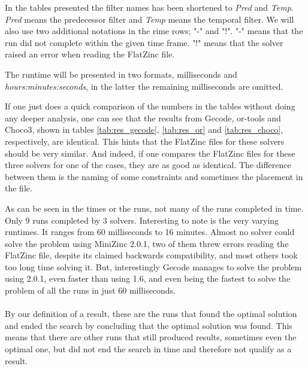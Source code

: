 In the tables presented the filter names has been shortened to \emph{Pred} and \emph{Temp}. \emph{Pred} means the predecessor filter and \emph{Temp} means the temporal filter. We will also use two additional notations in the rime rows; "-" and "!". "-" means that the run did not complete within the given time frame. "!" means that the solver raised an error when reading the FlatZinc file.

The runtime will be presented in two formats, milliseconds and \emph{hours:minutes:seconds}, in the latter the remaining milliseconds are omitted.














If one just does a quick comparison of the numbers in the tables without doing any deeper analysis, one can see that the results from Gecode, or-tools and Choco3, shown in tables \ref{tab:res_gecode}, \ref{tab:res_or} and \ref{tab:res_choco}, respectively, are identical. This hints that the FlatZinc files for these solvers should be very similar. And indeed, if one compares the FlatZinc files for these three solvers for one of the cases, they are as good as identical. The difference between them is the naming of some constraints and sometimes the placement in the file.

As can be seen in the times or the runs, not many of the runs completed in time. Only 9 runs completed by 3 solvers. Interesting to note is the very varying runtimes. It ranges from 60 milliseconds to 16 minutes. Almost no solver could solve the problem using MiniZinc 2.0.1, two of them threw errors reading the FlatZinc file, despite its claimed backwards compatibility, and most others took too long time solving it. But, interestingly Gecode manages to solve the problem using 2.0.1, even faster than using 1.6, and even being the fastest to solve the problem of all the runs in just 60 milliseconds.
\\\\
By our definition of a result, these are the runs that found the optimal solution and ended the search by concluding that the optimal solution was found. This means that there are other runs that still produced results, sometimes even the optimal one, but did not end the search in time and therefore not qualify as a result.

